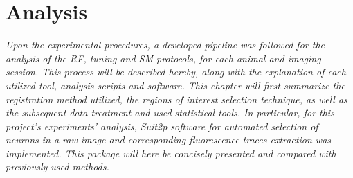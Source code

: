 
\chapter{Analysis}
\label{cap:Analysis}

\textit{Upon the experimental procedures, a developed pipeline was followed for the analysis of the RF, tuning and SM protocols, for each animal and imaging session. This process will be described hereby, along with the explanation of each utilized tool, analysis scripts and software. This chapter will first summarize the registration method utilized, the regions of interest selection technique, as well as the subsequent data treatment and used statistical tools. In particular, for this project's experiments' analysis, Suit2p software for automated selection of neurons in a raw image and corresponding fluorescence traces extraction was implemented. This package will here be concisely presented and compared with previously used methods.}






\cleardoublepage